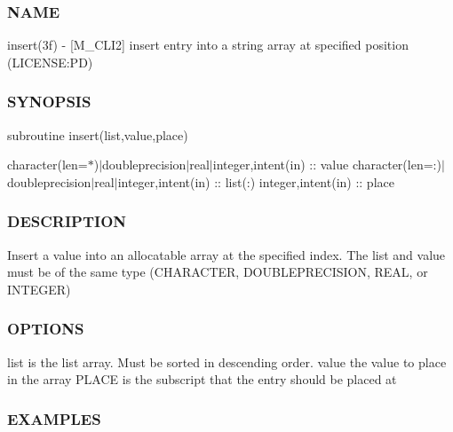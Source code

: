 \subsubsection*{N\+A\+ME}

insert(3f) -\/ \mbox{[}M\+\_\+\+C\+L\+I2\mbox{]} insert entry into a string array at specified position (L\+I\+C\+E\+N\+SE\+:PD) 

\subsubsection*{S\+Y\+N\+O\+P\+S\+IS}

subroutine insert(list,value,place)

character(len=$\ast$)$\vert$doubleprecision$\vert$real$\vert$integer,intent(in) \+:\+: value character(len=\+:)$\vert$doubleprecision$\vert$real$\vert$integer,intent(in) \+:\+: list(\+:) integer,intent(in) \+:\+: place

\subsubsection*{D\+E\+S\+C\+R\+I\+P\+T\+I\+ON}

\begin{DoxyVerb}Insert a value into an allocatable array at the specified index.
The list and value must be of the same type (CHARACTER, DOUBLEPRECISION,
REAL, or INTEGER)
\end{DoxyVerb}


\subsubsection*{O\+P\+T\+I\+O\+NS}

\begin{DoxyVerb}list    is the list array. Must be sorted in descending order.
value   the value to place in the array
PLACE   is the subscript that the entry should be placed at
\end{DoxyVerb}


\subsubsection*{E\+X\+A\+M\+P\+L\+ES}

